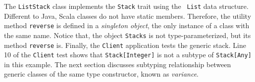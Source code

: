 The {\tt ListStack} class implements the {\tt Stack} trait using the {\tt 
List} data structure. Different to Java, Scala classes do not have static 
members.  Therefore, the utility method {\tt reverse} is defined in a {\it 
singleton object}, the only instance of a class with the same name.  Notice 
that, the object {\tt Stacks} is not type-parameterized, but its method 
{\tt reverse} is.  Finally, the {\tt Client} application tests the generic 
stack.  Line 10 of the {\tt Client} test shows that {\tt Stack[Integer]}
is not a subtype of {\tt Stack[Any]} in this example.  The next section discusses
subtyping relationship between generic classes of the same type constructor, known
as {\it variance}.

\begin{comment}
\subsubsection{Type Bounds}
\label{scala_type_bound_example} 

In the above section, we defined a type parameterized stack to which only 
values 
whose type is the same as its type variable can be pushed.  The benefit is that 
data popped from the type parameterized stack always has an expected type.  In 
a sense, the {\tt push(elt:E):Unit} method of {\tt Stack[E]} specified in 
Figure~\ref{scala_generic_example} is overly restrictive because it only 
accepts an argument of type {\tt E}, but not data of a subtype of {\tt E}.

Figure~\ref{scala_generic_bound_example} gives a more flexible Stack, the types 
of whose elements are either the same as the type parameter or subtypes of the 
type parameter.  In Figure~\ref{scala_generic_bound_example}, the signature of 
{\tt push} is changed to {\tt push[T$<$:E](elt:T):Unit}, with an additional 
type parameter {\tt T$<:$E} which denotes that {\tt T} is a subtype of {\tt E}. 
 
In Scala, {\tt E} is called the {\it upper bound} of {\tt T}.  Similarly, {\tt 
T$>:$E} means {\tt T} is a supertype of {\tt E} and {\tt E} is called the {\it 
lower bound} of {\tt T}.  In Scala, {\tt Any} is the supertype of all types 
and {\tt Nothing} is the subtype of all types.

\begin{figure}[h]
  \begin{lstlisting}[language=scala, escapechar=?]
object ArrayCopy extends App{
  def copy[E, T>:E, S<:E](des:Array[T], src:Array[S]):Unit = {
    for( i <- 0 until src.length){
      des(i) = src(i)
    }
  }
  

\end{comment}
